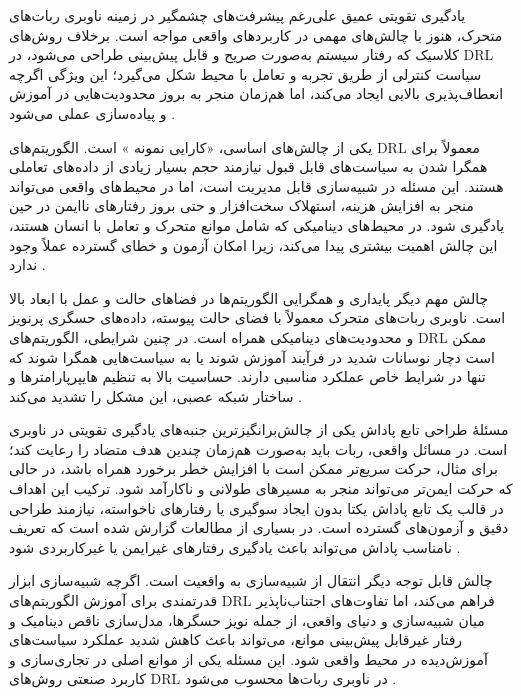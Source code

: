 یادگیری تقویتی عمیق علی‌رغم پیشرفت‌های چشمگیر در زمینه ناوبری ربات‌های متحرک، هنوز با چالش‌های مهمی در کاربردهای واقعی مواجه است. برخلاف روش‌های کلاسیک که رفتار سیستم به‌صورت صریح و قابل پیش‌بینی طراحی می‌شود، در DRL سیاست کنترلی از طریق تجربه و تعامل با محیط شکل می‌گیرد؛ این ویژگی اگرچه انعطاف‌پذیری بالایی ایجاد می‌کند، اما هم‌زمان منجر به بروز محدودیت‌هایی در آموزش و پیاده‌سازی عملی می‌شود%
\cite{Le2024DRLNavigationSurvey}.

یکی از چالش‌های اساسی، «کارایی نمونه%
»%
است. الگوریتم‌های DRL معمولاً برای همگرا شدن به سیاست‌های قابل قبول نیازمند حجم بسیار زیادی از داده‌های تعاملی هستند. این مسئله در شبیه‌سازی قابل مدیریت است، اما در محیط‌های واقعی می‌تواند منجر به افزایش هزینه، استهلاک سخت‌افزار و حتی بروز رفتارهای ناایمن در حین یادگیری شود. در محیط‌های دینامیکی که شامل موانع متحرک و تعامل با انسان هستند، این چالش اهمیت بیشتری پیدا می‌کند، زیرا امکان آزمون و خطای گسترده عملاً وجود ندارد%
\cite{Le2024DRLNavigationSurvey}.

چالش مهم دیگر پایداری و همگرایی الگوریتم‌ها در فضاهای حالت و عمل با ابعاد بالا است. ناوبری ربات‌های متحرک معمولاً با فضای حالت پیوسته، داده‌های حسگری پرنویز و محدودیت‌های دینامیکی همراه است. در چنین شرایطی، الگوریتم‌های DRL ممکن است دچار نوسانات شدید در فرآیند آموزش شوند یا به سیاست‌هایی همگرا شوند که تنها در شرایط خاص عملکرد مناسبی دارند. حساسیت بالا به تنظیم هایپرپارامترها و ساختار شبکه عصبی، این مشکل را تشدید می‌کند%
\cite{Le2024DRLNavigationSurvey}.

مسئلهٔ طراحی تابع پاداش یکی از چالش‌برانگیزترین جنبه‌های یادگیری تقویتی در ناوبری است. در مسائل واقعی، ربات باید به‌صورت هم‌زمان چندین هدف متضاد را رعایت کند؛ برای مثال، حرکت سریع‌تر ممکن است با افزایش خطر برخورد همراه باشد، در حالی که حرکت ایمن‌تر می‌تواند منجر به مسیرهای طولانی و ناکارآمد شود. ترکیب این اهداف در قالب یک تابع پاداش یکتا بدون ایجاد سوگیری یا رفتارهای ناخواسته، نیازمند طراحی دقیق و آزمون‌های گسترده است. در بسیاری از مطالعات گزارش شده است که تعریف نامناسب پاداش می‌تواند باعث یادگیری رفتارهای غیرایمن یا غیرکاربردی شود%
\cite{Le2024DRLNavigationSurvey}.

چالش قابل توجه دیگر انتقال از شبیه‌سازی به واقعیت است. اگرچه شبیه‌سازی ابزار قدرتمندی برای آموزش الگوریتم‌های DRL فراهم می‌کند، اما تفاوت‌های اجتناب‌ناپذیر میان شبیه‌سازی و دنیای واقعی، از جمله نویز حسگرها، مدل‌سازی ناقص دینامیک و رفتار غیرقابل پیش‌بینی موانع، می‌تواند باعث کاهش شدید عملکرد سیاست‌های آموزش‌دیده در محیط واقعی شود. این مسئله یکی از موانع اصلی در تجاری‌سازی و کاربرد صنعتی روش‌های DRL در ناوبری ربات‌ها محسوب می‌شود%
\cite{Le2024DRLNavigationSurvey}.

